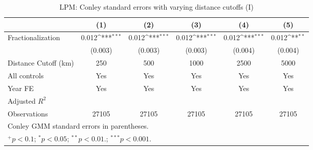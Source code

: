 \begin{table}[htbp]\centering
\def\sym#1{\ifmmode^{#1}\else\(^{#1}\)\fi}
\caption{LPM: Conley standard errors with varying distance cutoffs (I) \label{tab:rob:cnl1}}
\begin{tabular}{l*{5}{c}}
\hline\hline
                    &\multicolumn{1}{c}{(1)}         &\multicolumn{1}{c}{(2)}         &\multicolumn{1}{c}{(3)}         &\multicolumn{1}{c}{(4)}         &\multicolumn{1}{c}{(5)}         \\
\hline
Fractionalization   &       0.012\sym{***}&       0.012\sym{***}&       0.012\sym{***}&       0.012\sym{***}&       0.012\sym{**} \\
                    &     (0.003)         &     (0.003)         &     (0.003)         &     (0.004)         &     (0.004)         \\
\hline
Distance Cutoff (km)&         250         &         500         &        1000         &        2500         &        5000         \\
All controls        &         Yes         &         Yes         &         Yes         &         Yes         &         Yes         \\
Year FE             &         Yes         &         Yes         &         Yes         &         Yes         &         Yes         \\
Adjusted $ R^{2} $  &                     &                     &                     &                     &                     \\
Observations        &       27105         &       27105         &       27105         &       27105         &       27105         \\
\hline\hline
\multicolumn{6}{l}{\footnotesize Conley GMM standard errors in parentheses.}\\
\multicolumn{6}{l}{\footnotesize $^{+}p<0.1$; $^{*}p<0.05$; $^{**}p<0.01.$; $^{***}p<0.001.$ }\\
\end{tabular}
\end{table}
